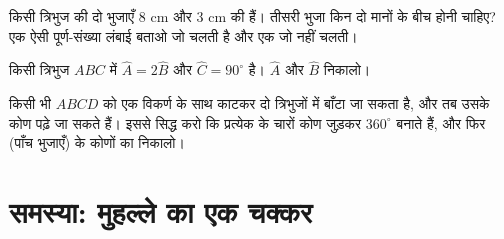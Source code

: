 \begin{exercise}[$\star\star$]\label{exo:g7:triangles:9}
किसी त्रिभुज की दो भुजाएँ $8$ cm और $3$ cm की हैं। तीसरी भुजा किन
दो मानों के बीच होनी चाहिए? एक ऐसी पूर्ण-संख्या लंबाई बताओ जो चलती
है और एक जो नहीं चलती।
\end{exercise}

\begin{exercise}[$\star\star$]\label{exo:g7:triangles:10}
किसी त्रिभुज $ABC$ में $\widehat A = 2\widehat B$ और
$\widehat C = 90^\circ$ है। $\widehat A$ और $\widehat B$ निकालो।
\end{exercise}

\begin{exercise}[$\star\star\star$]\label{exo:g7:triangles:11}
किसी भी  $ABCD$ को एक विकर्ण के साथ काटकर दो त्रिभुजों में
बाँटा जा सकता है, और तब उसके कोण पढ़े जा सकते हैं। इससे सिद्ध करो
कि प्रत्येक  के चारों कोण जुड़कर $360^\circ$ बनाते हैं, और
फिर  (पाँच भुजाएँ) के कोणों का  निकालो।
\end{exercise}

\section{समस्या: मुहल्ले का एक चक्कर}

